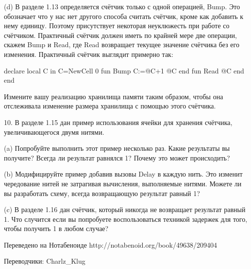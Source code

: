 (d) В разделе 1.13 определяется счётчик только с одной операцией, Bump. Это обозначает что у нас нет другого способа считать счётчик, кроме как добавить к нему единицу. Поэтому присутствует некоторая неуклюжесть при работе со счётчиком. Практичный счётчик должен иметь по крайней мере две операции, скажем Bump и Read, где Read возвращает текущее значение счётчика без его изменения. Практичный счётчик выглядит примерно так:

declare
local C in
C={NewCell 0}
fun {Bump}
C:=@C+1
@C
end
fun {Read}
@C
end
end

Измените вашу реализацию хранилища памяти таким образом, чтобы она отслеживала изменение размера хранилища с помощью этого счётчика.

10. В разделе 1.15 дан пример использования ячейки для хранения счётчика, увеличивающегося двумя нитями.

(a) Попробуйте выполнить этот пример несколько раз. Какие результаты вы получите? Всегда ли результат равнялся 1? Почему это может происходить?

(b) Модифицируйте пример добавив вызовы Delay в каждую нить. Это изменит чередование нитей не затрагивая вычисления, выполняемые нитями. Можете ли вы разработать схему, всегда возвращающую результат равный 1?

(c) В разделе 1.16 дан счётчик, который никогда не возвращает результат равный 1. Что случится если вы попробуете воспользоваться техникой задержек для того, чтобы получить 1 в любом случае?

Переведено на Нотабеноиде
http://notabenoid.org/book/49638/209404

Переводчики: Charlz\_Klug

